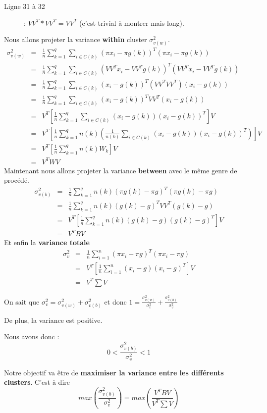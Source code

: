 \documentclass[a4paper, 11pt, onecolumn]{article}
\begin{document}
\begin{enumerate}
\begin{framed}
\begin{description}
  \item[Ligne 31 à 32] : $VV^T*VV^T = VV^T$ (c'est trivial à montrer mais long).
\end{description}
  Nous allons projeter la variance \textbf{within} cluster $\sigma_{v(w)}^2$. 
\begin{eqnarray}
\sigma_{v(w)}^2 &=& \frac{1}{n}\sum_{k=1}^q\sum_{i\in C(k)} (\pi x_i-\pi g(k))^T(\pi x_i-\pi g(k))\\
 &=& \frac{1}{n}\sum_{k=1}^q\sum_{i\in C(k)}(VV^T x_i-VV^T g(k))^T(VV^T x_i-VV^Tg(k))\\
&=& \frac{1}{n}\sum_{k=1}^q\sum_{i\in C(k)}(x_i-g(k))^T(VV^TVV^T)(x_i-g(k))\\
&=& \frac{1}{n}\sum_{k=1}^q\sum_{i\in C(k)}(x_i-g(k))^TVV^T(x_i-g(k))\\
&=& V^T\left[\frac{1}{n}\sum_{k=1}^q\sum_{i\in C(k)}(x_i-g(k))(x_i-g(k))^T\right]V\\
&=& V^T\left[\frac{1}{n}\sum_{k=1}^qn(k)\left(\frac{1}{n(k)}\sum_{i\in C(k)}(x_i-g(k))(x_i-g(k))^T\right)\right]V\\
&=& V^T\left[\frac{1}{n}\sum_{k=1}^qn(k)W_k\right]V\\
&=& V^TWV
\end{eqnarray}
Maintenant nous allons projeter la variance \textbf{between} avec le même genre de procédé.
\begin{eqnarray}
\sigma_{v(b)}^2 &=& \frac{1}{n} \sum_{k=1}^q n(k) (\pi g(k) - \pi g)^T (\pi g(k) - \pi g)\\
&=& \frac{1}{n} \sum_{k=1}^q n(k) (g(k) - g)^TVV^T(g(k) - g)\\
&=& V^T\left[\frac{1}{n}\sum_{k=1}^q n(k) (g(k) - g)(g(k) - g)^T\right]V\\
&=& V^TBV
\end{eqnarray}
Et enfin la \textbf{variance totale}
\begin{eqnarray}
\sigma_v^2 &=& \frac{1}{n}\sum_{i=1}^n (\pi x_i-\pi g)^T(\pi x_i-\pi g)\\
&=& V^T\left[\frac{1}{n}\sum_{i=1}^n (x_i- g)(x_i- g)^T\right]V\\
&=& V^T\sum V
\end{eqnarray}
\end{framed}

\begin{description}
  \item {On sait que $\sigma_v^2 = \sigma_{v(w)}^2 + \sigma_{v(b)}^2$ et donc $1 = \frac{\sigma_{v(w)}^2}{\sigma_v^2} + \frac{\sigma_{v(b)}^2}{\sigma_v^2}$}
  \item {De plus, la variance est positive.}
\item {Nous avons donc : }
    $$0 < \frac{\sigma_{v(b)}^2}{\sigma_v^2} < 1$$
\end{description}
Notre objectif va être de \textbf{maximiser la variance entre les différents clusters}. C'est à dire
$$max\left(\frac{\sigma_{v(b)}^2}{\sigma_v^2}\right)=max\left(\frac{V^TBV}{V^T\sum V}\right)$$


\end{enumerate}
\end{document}
